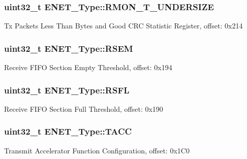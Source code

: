 \subsubsection[{\texorpdfstring{R\+M\+O\+N\+\_\+\+T\+\_\+\+U\+N\+D\+E\+R\+S\+I\+ZE}{RMON_T_UNDERSIZE}}]{ uint32\+\_\+t E\+N\+E\+T\+\_\+\+Type\+::\+R\+M\+O\+N\+\_\+\+T\+\_\+\+U\+N\+D\+E\+R\+S\+I\+ZE}\hypertarget{structENET__Type_a5607827f0ac776c6cb525620c0870ad4}{}\label{structENET__Type_a5607827f0ac776c6cb525620c0870ad4}
Tx Packets Less Than Bytes and Good C\+RC Statistic Register, offset\+: 0x214 
\subsubsection[{\texorpdfstring{R\+S\+EM}{RSEM}}]{ uint32\+\_\+t E\+N\+E\+T\+\_\+\+Type\+::\+R\+S\+EM}\hypertarget{structENET__Type_a49cfa21fc1837cfd58a8f8d159286e46}{}\label{structENET__Type_a49cfa21fc1837cfd58a8f8d159286e46}
Receive F\+I\+FO Section Empty Threshold, offset\+: 0x194 
\subsubsection[{\texorpdfstring{R\+S\+FL}{RSFL}}]{ uint32\+\_\+t E\+N\+E\+T\+\_\+\+Type\+::\+R\+S\+FL}\hypertarget{structENET__Type_a78e0c9198f7b28a5183ad00dc01d6dec}{}\label{structENET__Type_a78e0c9198f7b28a5183ad00dc01d6dec}
Receive F\+I\+FO Section Full Threshold, offset\+: 0x190 
\subsubsection[{\texorpdfstring{T\+A\+CC}{TACC}}]{ uint32\+\_\+t E\+N\+E\+T\+\_\+\+Type\+::\+T\+A\+CC}\hypertarget{structENET__Type_a78e9161d922623a708995cda7f50d32c}{}\label{structENET__Type_a78e9161d922623a708995cda7f50d32c}
Transmit Accelerator Function Configuration, offset\+: 0x1\+C0 
